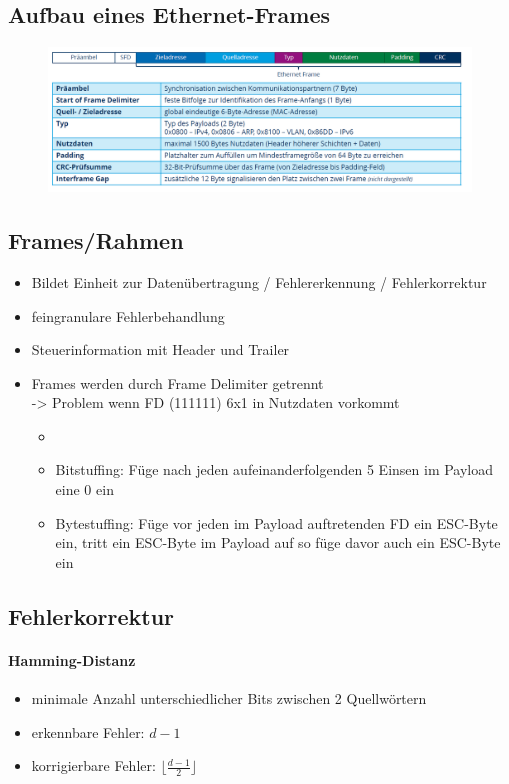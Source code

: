 \documentclass[12pt,a4paper]{article}
\begin{document}
\subsection{Aufbau eines Ethernet-Frames}
\begin{figure}[H]
\includegraphics[scale=0.4]{./resources/ether-frame.png}
\end{figure}

\subsection{Frames/Rahmen}
\begin{itemize}
\item Bildet Einheit zur Datenübertragung / Fehlererkennung / Fehlerkorrektur
\item feingranulare Fehlerbehandlung
\item Steuerinformation mit Header und Trailer
\item Frames werden durch Frame Delimiter getrennt\\
-> Problem wenn FD (111111) 6x1 in Nutzdaten vorkommt
\begin{itemize}
\item 
\item Bitstuffing: Füge nach jeden aufeinanderfolgenden 5 Einsen im Payload eine 0 ein
\item Bytestuffing: Füge vor jeden im Payload auftretenden FD ein ESC-Byte ein, tritt ein ESC-Byte im Payload auf so füge davor auch ein ESC-Byte ein
\end{itemize}
\end{itemize}

\subsection{Fehlerkorrektur}
\paragraph{Hamming-Distanz}
\begin{itemize}
\item minimale Anzahl unterschiedlicher Bits zwischen 2 Quellwörtern
\item erkennbare Fehler: $d-1$
\item korrigierbare Fehler: $\lfloor\frac{d-1}{2}\rfloor$
\end{itemize}
\end{document}
